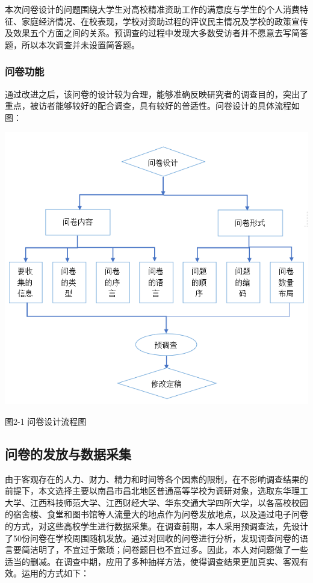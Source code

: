 \documentclass[UTF8,a4paper,12pt]{ctexart}  %
\begin{document}
本次问卷设计的问题围绕大学生对高校精准资助工作的满意度与学生的个人消费特征、家庭经济情况、在校表现，学校对资助过程的评议民主情况及学校的政策宣传及效果五个方面之间的关系。预调查的过程中发现大多数受访者并不愿意去写简答题，所以本次调查并未设置简答题。

\hypertarget{section-16}{%
\subsubsection{问卷功能}\label{section-16}}

通过改进之后，该问卷的设计较为合理，能够准确反映研究者的调查目的，突出了重点，被访者能够较好的配合调查，具有较好的普适性。问卷设计的具体流程如图：

\includegraphics{idprocess.png}

图2-1 问卷设计流程图

\hypertarget{section-17}{%
\subsection{问卷的发放与数据采集}\label{section-17}}

由于客观存在的人力、财力、精力和时间等各个因素的限制，在不影响调查结果的前提下，本文选择主要以南昌市昌北地区普通高等学校为调研对象，选取东华理工大学、江西科技师范大学、江西财经大学、华东交通大学四所大学，以各高校校园的宿舍楼、食堂和图书馆等人流量大的地点作为问卷发放地点，以及通过电子问卷的方式，对这些高校学生进行数据采集。在调查前期，本人采用预调查法，先设计了50份问卷在学校周围随机发放。通过对回收的问卷进行分析，发现调查问卷的语言要简洁明了，不宜过于繁琐；问卷题目也不宜过多。因此，本人对问题做了一些适当的删减。在调查中期，应用了多种抽样方法，使得调查结果更加真实、客观有效。运用的方式如下：
\end{document}
